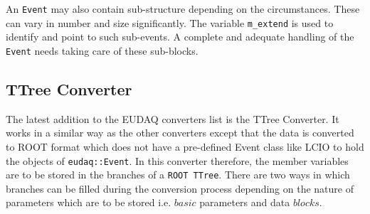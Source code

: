  An \lstinline[style=cpp]{Event} may also contain sub-structure depending on the circumstances. These can vary in number and size significantly. The variable \lstinline[style=cpp]{m_extend} is used to identify and point to such sub-events. A complete and adequate handling of the \lstinline[style=cpp]{Event} needs taking care of these sub-blocks. 

 
 \subsection{ TTree Converter} 
 
 The latest addition to the EUDAQ converters list is the TTree Converter. It works in a similar way as the other converters except that the data is converted to ROOT format which does not have a pre-defined Event class like LCIO to hold the objects of \texttt{eudaq::Event}. In this converter therefore, the member variables are to be stored in the branches of a \texttt{ROOT TTree}. There are two ways in which branches can be filled during the conversion process depending on the nature of parameters which are to be stored i.e. $basic$ parameters and data $blocks$. 
 
